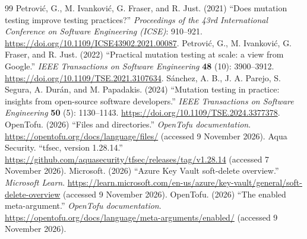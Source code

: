 \begin{thebibliography}{99}
 Petrovi\'{c}, G., M. Ivankovi\'{c}, G. Fraser, and R. Just. (2021) ``Does mutation testing improve testing practices?'' \textit{Proceedings of the 43rd International Conference on Software Engineering (ICSE)}: 910--921. \url{https://doi.org/10.1109/ICSE43902.2021.00087}.
 Petrovi\'{c}, G., M. Ivankovi\'{c}, G. Fraser, and R. Just. (2022) ``Practical mutation testing at scale: a view from Google.'' \textit{IEEE Transactions on Software Engineering} \textbf{48} (10): 3900--3912. \url{https://doi.org/10.1109/TSE.2021.3107634}.
 S\'{a}nchez, A. B., J. A. Parejo, S. Segura, A. Dur\'{a}n, and M. Papadakis. (2024) ``Mutation testing in practice: insights from open-source software developers.'' \textit{IEEE Transactions on Software Engineering} \textbf{50} (5): 1130--1143. \url{https://doi.org/10.1109/TSE.2024.3377378}.
 OpenTofu. (2026) ``Files and directories.'' \textit{OpenTofu documentation}. \url{https://opentofu.org/docs/language/files/} (accessed 9 November 2026).
 Aqua Security. ``tfsec, version 1.28.14.'' \url{https://github.com/aquasecurity/tfsec/releases/tag/v1.28.14} (accessed 7 November 2026).
 Microsoft. (2026) ``Azure Key Vault soft-delete overview.'' \textit{Microsoft Learn}. \url{https://learn.microsoft.com/en-us/azure/key-vault/general/soft-delete-overview} (accessed 9 November 2026).
 OpenTofu. (2026) ``The enabled meta-argument.'' \textit{OpenTofu documentation}. \url{https://opentofu.org/docs/language/meta-arguments/enabled/} (accessed 9 November 2026).
\end{thebibliography}
